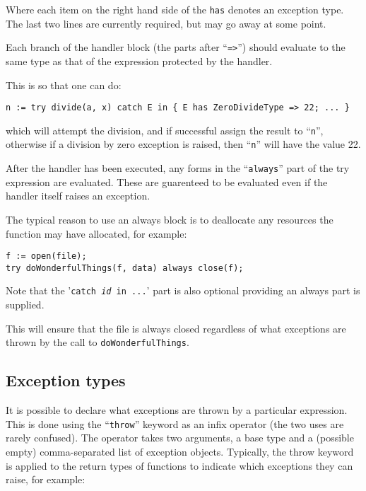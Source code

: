 \documentclass{article}
\begin{document}
Where each item on the right hand side of the {\tt has} denotes an
exception type.  The last two lines are currently required, but may go
away at some point.

Each branch of the handler block (the parts after ``{\tt =>}'') should
evaluate to the same type as that of the expression protected by the
handler.

This is so that one can do:

\begin{verbatim}
n := try divide(a, x) catch E in { E has ZeroDivideType => 22; ... }
\end{verbatim}

which will attempt the division, and if successful assign the result
to ``{\tt n}'', otherwise if a division by zero exception is raised,
then ``{\tt n}'' will have the value 22.

After the handler has been executed, any forms in the ``{\tt always}''
part of the try expression are evaluated.  These are guarenteed to be
evaluated even if the handler itself raises an exception.

The typical reason to use an always block is to deallocate any
resources the function may have allocated, for example:

\begin{center}
\begin{verbatim}
f := open(file);
try doWonderfulThings(f, data) always close(f);
\end{verbatim}
\end{center}

Note that the '{\tt catch {\em id} in ...}' part is also optional
providing an always part is supplied.

This will ensure that the file is always closed regardless of what
exceptions are thrown by the call to {\tt doWonderfulThings}.

\subsection{Exception types}

It is possible to declare what exceptions are thrown by a particular
expression.  This is done using the ``{\tt throw}'' keyword as an
infix operator (the two uses are rarely confused).  The operator takes
two arguments, a base type and a (possible empty) comma-separated list
of exception objects.  Typically, the throw keyword is applied to the
return types of functions to indicate which exceptions they can raise,
for example:
\end{document}

